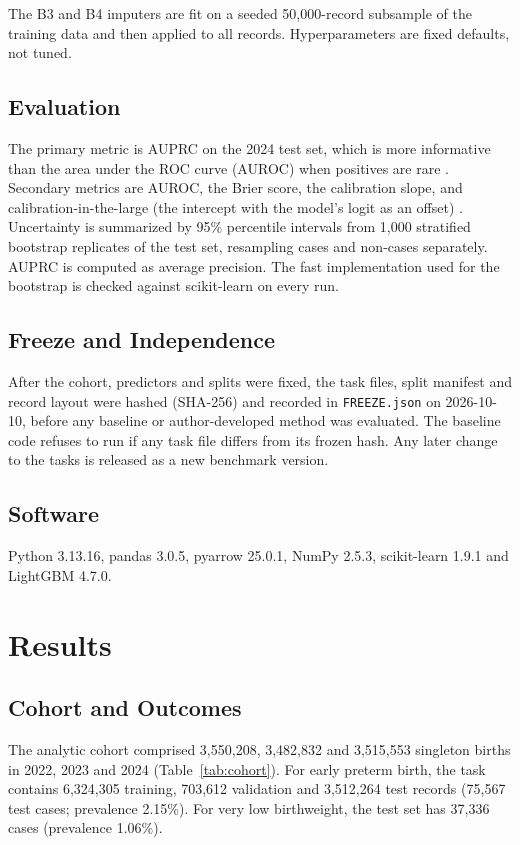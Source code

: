 \documentclass[journal]{IEEEtran}
\begin{document}
The B3 and B4 imputers are fit on a seeded 50,000-record subsample of the training data and then applied to all records. Hyperparameters are fixed defaults, not tuned.

\subsection{Evaluation}

The primary metric is AUPRC on the 2024 test set, which is more informative than the area under the ROC curve (AUROC) when positives are rare \cite{saito2015}. Secondary metrics are AUROC, the Brier score, the calibration slope, and calibration-in-the-large (the intercept with the model's logit as an offset) \cite{vancalster2019}. Uncertainty is summarized by 95\% percentile intervals from 1,000 stratified bootstrap replicates of the test set, resampling cases and non-cases separately. AUPRC is computed as average precision. The fast implementation used for the bootstrap is checked against scikit-learn on every run.

\subsection{Freeze and Independence}

After the cohort, predictors and splits were fixed, the task files, split manifest and record layout were hashed (SHA-256) and recorded in \texttt{FREEZE.json} on 2026-10-10, before any baseline or author-developed method was evaluated. The baseline code refuses to run if any task file differs from its frozen hash. Any later change to the tasks is released as a new benchmark version.

\subsection{Software}

Python 3.13.16, pandas 3.0.5, pyarrow 25.0.1, NumPy 2.5.3, scikit-learn 1.9.1 and LightGBM 4.7.0.

\section{Results}

\subsection{Cohort and Outcomes}

The analytic cohort comprised 3,550,208, 3,482,832 and 3,515,553 singleton births in 2022, 2023 and 2024 (Table~\ref{tab:cohort}). For early preterm birth, the task contains 6,324,305 training, 703,612 validation and 3,512,264 test records (75,567 test cases; prevalence 2.15\%). For very low birthweight, the test set has 37,336 cases (prevalence 1.06\%).
\end{document}
